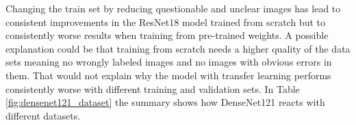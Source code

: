 \begin{table}[h] \centering
{}
\caption{Dataset variations with ResNet18. The first group shows how the datasets performed when trained from scratch whereas the second group shows how the datasets performed with pre-training.}
\label{tbl:resnet18_dataset}
\end{table}

Changing the train set by reducing questionable and unclear images has lead to consistent improvements in the ResNet18 model trained from scratch but to consistently worse results when training from pre-trained weights. A possible explanation could be that training from scratch needs a higher quality of the data sets meaning no wrongly labeled images and no images with obvious errors in them. That would not explain why the model with transfer learning performs consistently worse with different training and validation sets. In Table \ref{fig:densenet121_dataset} the summary shows how DenseNet121 reacts with different datasets.

